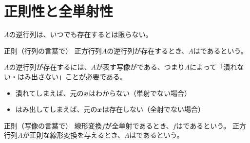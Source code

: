 \documentclass[../../../topic_linear-algebra]{subfiles}
\begin{document}
\sectionline
\section{正則性と全単射性}

$A$の逆行列は、いつでも存在するとは限らない。

\begin{definition*}{正則（行列の言葉で）}
  正方行列$A$の逆行列が存在するとき、$A$はであるという。
\end{definition*}

\br

$A$の逆行列が存在するには、$A$が表す写像がである、つまり$A$によって「潰れない・はみ出さない」ことが必要である。

\begin{itemize}
  \item 潰れてしまえば、元の$\vb*{x}$はわからない（単射でない場合）
  \item はみ出してしまえば、元の$\vb*{x}$は存在しない（全射でない場合）
\end{itemize}

\begin{definition*}{正則（写像の言葉で）}
  線形変換$f$が全単射であるとき、$f$はであるという。
  正方行列$A$が正則な線形変換を与えるとき、$A$はであるという。
\end{definition*}
\end{document}
